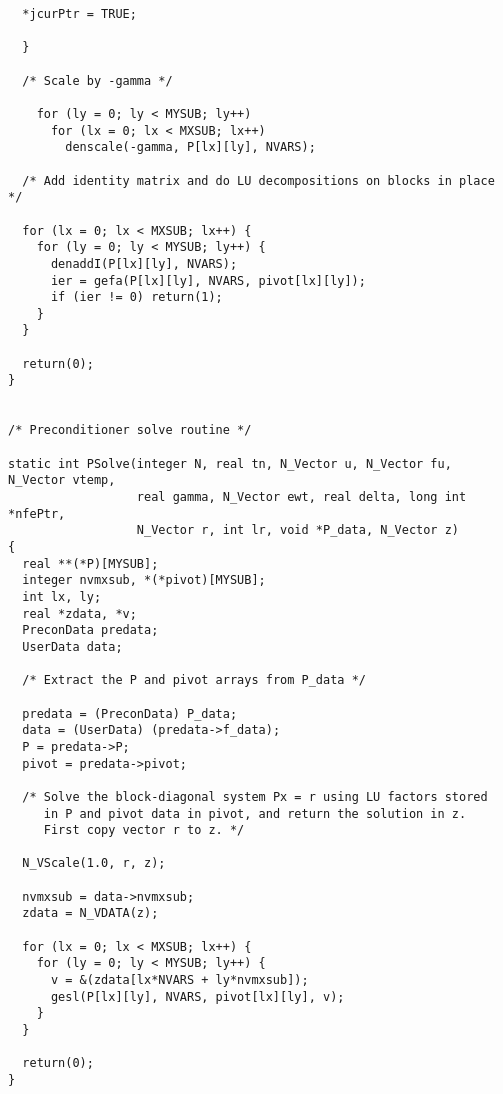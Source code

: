 \begin{verbatim}
  *jcurPtr = TRUE;

  }

  /* Scale by -gamma */

    for (ly = 0; ly < MYSUB; ly++)
      for (lx = 0; lx < MXSUB; lx++)
        denscale(-gamma, P[lx][ly], NVARS);

  /* Add identity matrix and do LU decompositions on blocks in place */

  for (lx = 0; lx < MXSUB; lx++) {
    for (ly = 0; ly < MYSUB; ly++) {
      denaddI(P[lx][ly], NVARS);
      ier = gefa(P[lx][ly], NVARS, pivot[lx][ly]);
      if (ier != 0) return(1);
    }
  }

  return(0);
}


/* Preconditioner solve routine */

static int PSolve(integer N, real tn, N_Vector u, N_Vector fu, N_Vector vtemp,
                  real gamma, N_Vector ewt, real delta, long int *nfePtr,
                  N_Vector r, int lr, void *P_data, N_Vector z)
{
  real **(*P)[MYSUB];
  integer nvmxsub, *(*pivot)[MYSUB];
  int lx, ly;
  real *zdata, *v;
  PreconData predata;
  UserData data;

  /* Extract the P and pivot arrays from P_data */

  predata = (PreconData) P_data;
  data = (UserData) (predata->f_data);
  P = predata->P;
  pivot = predata->pivot;

  /* Solve the block-diagonal system Px = r using LU factors stored
     in P and pivot data in pivot, and return the solution in z.
     First copy vector r to z. */

  N_VScale(1.0, r, z);

  nvmxsub = data->nvmxsub;
  zdata = N_VDATA(z);

  for (lx = 0; lx < MXSUB; lx++) {
    for (ly = 0; ly < MYSUB; ly++) {
      v = &(zdata[lx*NVARS + ly*nvmxsub]);
      gesl(P[lx][ly], NVARS, pivot[lx][ly], v);
    }
  }

  return(0);
}

\end{verbatim}




